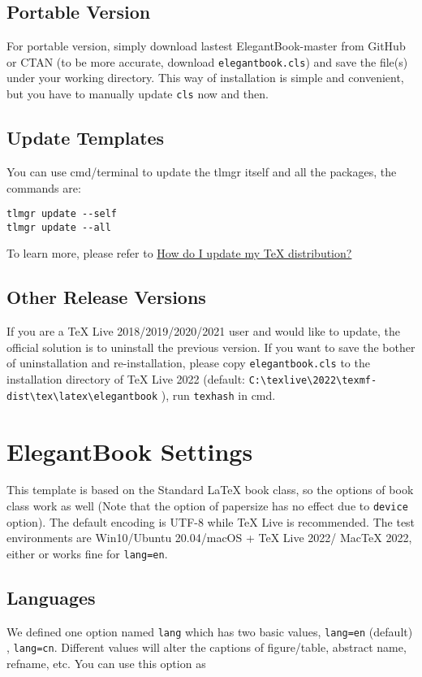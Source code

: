 \documentclass[11pt]{elegantbook}
\begin{document}
\section{Portable Version}
For portable version, simply download lastest ElegantBook-master from GitHub or CTAN (to be more accurate, download \lstinline{elegantbook.cls}) and save the file(s) under your working directory. This way of installation is simple and convenient, but you have to manually update \lstinline{cls} now and then.


\section{Update Templates}
You can use cmd/terminal to update the tlmgr itself and all the packages, the commands are:
\begin{lstlisting}
tlmgr update --self
tlmgr update --all
\end{lstlisting}

To learn more, please refer to \href{https://tex.stackexchange.com/questions/55437/how-do-i-update-my-tex-distribution}{How do I update my \TeX{} distribution?}

\section{Other Release Versions}
If you are a \TeX{} Live 2018/2019/2020/2021 user and would like to update, the official solution is to uninstall the previous version. If you want to save the bother of uninstallation and re-installation, please copy \lstinline{elegantbook.cls} to the installation directory of \TeX{} Live 2022 (default: \lstinline|C:\texlive\2022\texmf-dist\tex\latex\elegantbook| ), run \lstinline{texhash} in cmd.

\chapter{ElegantBook Settings}
This template is based on the Standard \LaTeX{} book class, so the options of book class work as well (Note that the option of papersize has no effect due to \lstinline{device} option). The default encoding is UTF-8 while \TeX{} Live is recommended. The test environments are Win10/Ubuntu 20.04/macOS + \TeX{} Live 2022/ Mac\TeX{} 2022, either  or  works fine for \lstinline{lang=en}.

\section{Languages}
We defined one option named \lstinline{lang} which has two basic values, \lstinline{lang=en} (default) , \lstinline{lang=cn}. Different values will alter the captions of figure/table, abstract name, refname, etc. You can use this option as
\end{document}
